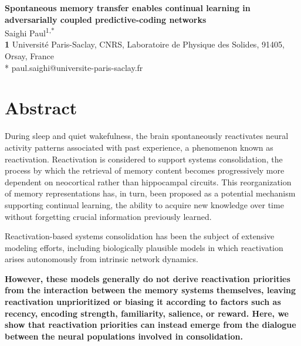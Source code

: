 \documentclass[10pt,letterpaper]{article}
\theoremstyle{plain}
\theoremstyle{remark}
\begin{document}
\begin{flushleft}
{\Large\textbf{Spontaneous memory transfer enables continual learning in adversarially coupled predictive-coding networks}}
\newline\\
Saighi Paul\textsuperscript{1,*}
\\
\bigskip
\textbf{1} Universit\'e Paris-Saclay, CNRS, Laboratoire de Physique des Solides, 91405, Orsay, France\\   
\bigskip
* paul.saighi@universite-paris-saclay.fr
\end{flushleft}

\section*{Abstract}


During sleep and quiet wakefulness, the brain spontaneously reactivates neural activity patterns associated with past experience, a phenomenon known as reactivation. Reactivation is considered to support systems consolidation, the process by which the retrieval of memory content becomes progressively more dependent on neocortical rather than hippocampal circuits. This reorganization of memory representations has, in turn, been proposed as a potential mechanism supporting continual learning, the ability to acquire new knowledge over time without forgetting crucial information previously learned.

Reactivation-based systems consolidation has been the subject of extensive modeling efforts, including biologically plausible models in which reactivation arises autonomously from intrinsic network dynamics. 

\textbf{However, these models generally do not derive reactivation priorities from the interaction between the memory systems themselves, leaving reactivation unprioritized or biasing it according to factors such as recency, encoding strength, familiarity, salience, or reward. Here, we show that reactivation priorities can instead emerge from the dialogue between the neural populations involved in consolidation.}
\end{document}
